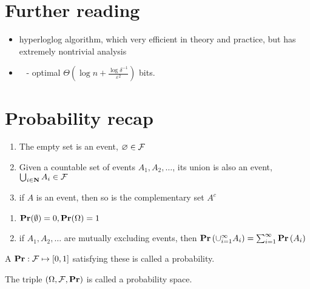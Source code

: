 \documentclass[11pt]{article}
\begin{document}
\section{Further reading}
\begin{itemize}
    \item hyperloglog algorithm, which very efficient in theory and practice, but has extremely nontrivial analysis \cite{DBLP:conf/esa/DurandF03} \cite{DBLP:conf/edbt/HeuleNH13}
    \item\ \cite{DBLP:conf/soda/Blasiok18} - optimal $\Theta(\log{n} + \frac{\log{\delta^{-1}}}{\varepsilon^2})$ bits.

\end{itemize}





\appendix
\section{Probability recap}
\begin{definition}
\begin{enumerate}
    \item The empty set is an event, $\varnothing \in \mathcal{F}$
    \item Given a countable set of events $A_1, A_2, \dots$, its union is also an event, $\bigcup_{i\in\mathbf{N}}A_i \in \mathcal{F}$
    \item if $A$ is an event, then so is the complementary set $A^c$
\end{enumerate}
\end{definition}

\begin{definition}
\begin{enumerate}
    \item $\mathbf{Pr}(\emptyset)=0, \mathbf{Pr}(\Omega)=1$
    \item if $A_1, A_2, \dots$ are mutually excluding events, then $\mathbf{Pr}\left(\cup_{i=1}^{\infty} A_{i}\right)=\sum_{i=1}^{\infty} \mathbf{Pr}\left(A_{i}\right)$
\end{enumerate}
A $\mathbf{Pr}: \mathcal{F} \mapsto[0,1]$ satisfying these is called a probability.

The triple $(\Omega, \mathcal{F}, \mathbf{Pr})$ is called a probability space.
\end{definition}
\end{document}
